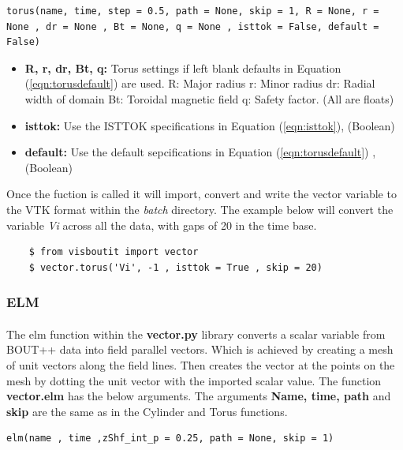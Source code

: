 \documentclass[12pt,a4paper]{article}
\begin{document}
\begin{verbatim}
torus(name, time, step = 0.5, path = None, skip = 1, R = None, r = None , dr = None , Bt = None, q = None , isttok = False, default = False)
\end{verbatim}

\begin{itemize}
	\item{\textbf{R, r, dr, Bt, q:} Torus settings if left blank defaults in Equation (\ref{eqn:torusdefault}) are used.
		R: Major radius
		r: Minor radius
		dr: Radial width of domain
		Bt: Toroidal magnetic field
		q: Safety factor. (All are floats)}
	\item{\textbf{isttok:} Use the ISTTOK specifications in Equation (\ref{eqn:isttok}), (Boolean)}
	\item{\textbf{default:} Use the default sepcifications in Equation (\ref{eqn:torusdefault}) , (Boolean)}
\end{itemize}


Once the fuction is called it will import, convert and write the vector variable to the VTK format within the \textit{batch} directory. The example below will convert the variable \textit{Vi} across all the data, with gaps of 20 in the time base.

\begin{verbatim}
	$ from visboutit import vector
	$ vector.torus('Vi', -1 , isttok = True , skip = 20)
\end{verbatim} 


\subsubsection{ELM}
\paragraph{}
The elm function within the \textbf{vector.py} library converts a scalar variable from BOUT++ data into field parallel vectors. Which is achieved by creating a mesh of unit vectors along the field lines. Then creates the vector at the points on the mesh by dotting the unit vector with the imported scalar value. The function \textbf{vector.elm} has the below arguments. The arguments \textbf{Name, time, path} and \textbf{skip} are the same as in the Cylinder and Torus functions.

\begin{verbatim}
elm(name , time ,zShf_int_p = 0.25, path = None, skip = 1)
\end{verbatim}
\end{document}
